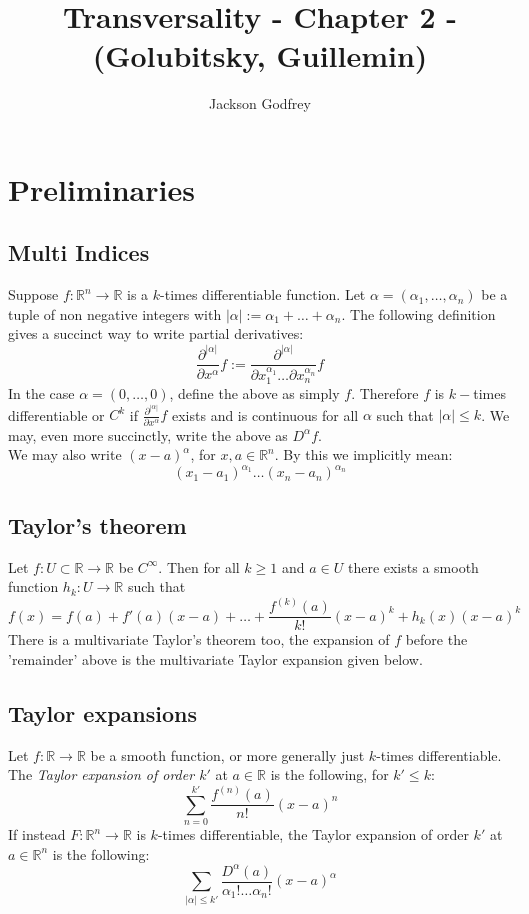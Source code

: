 \documentclass[12pt]{article}
\title{Transversality - Chapter 2 - (Golubitsky, Guillemin)}
\author{Jackson Godfrey}
\newcommand{\RR}{\mathbb{R}}
\begin{document}
\maketitle

\tableofcontents

\section*{Preliminaries}
\subsection*{Multi Indices}
Suppose $f: \RR^n \to \RR$ is a $k$-times differentiable function. Let $\alpha = (\alpha_1, \dots, \alpha_n)$ be a tuple of non negative integers with $|\alpha| := \alpha_1 + \dots + \alpha_n$. The following definition gives a succinct way to write partial derivatives:
$$
\frac{\partial^{|\alpha|}}{\partial x^\alpha} f := \frac{\partial^{|\alpha|}}{\partial x_1^{\alpha_1} \dots \partial x_n^{\alpha_n}} f
$$
In the case $\alpha = (0, \dots, 0)$, define the above as simply $f$. Therefore $f$ is $k-$times differentiable or $C^k$ if $\frac{\partial^{|\alpha|}}{\partial x^\alpha} f$ exists and is continuous for all $\alpha$ such that $|\alpha| \leq k$. We may, even more succinctly, write the above as $D^\alpha f$. \\

We may also write $(x-a)^\alpha$, for $x, a \in \RR^n$. By this we implicitly mean:
$$
(x_1-a_1)^{\alpha_1} \dots (x_n - a_n)^{\alpha_n}
$$

\subsection*{Taylor's theorem}

\begin{theorem} 
    Let $f: U\subset \RR \to \RR$ be $C^\infty$. Then for all $k \geq 1$ and $a\in U$ there exists a smooth function $h_k: U \to \RR$ such that 
    $$
    f(x) = f(a) + f'(a) (x-a) + \dots + \frac{f^{(k)}(a)}{k!} (x-a)^k + h_k(x) (x-a)^k 
    $$
    There is a multivariate Taylor's theorem too, the expansion of $f$ before the 'remainder' above is the multivariate Taylor expansion given below. 
\end{theorem}

\subsection*{Taylor expansions}
Let $f: \RR \to \RR$ be a smooth function, or more generally just $k$-times differentiable. The \emph{Taylor expansion of order $k'$} at $a\in \RR$ is the following, for $k' \leq k$: 
$$
\sum_{n=0}^{k'} \frac{f^{(n)}(a)}{n!} (x-a)^n
$$
If instead $F: \RR^n \to \RR$ is $k$-times differentiable, the Taylor expansion of order $k'$ at $a \in \RR^n$ is the following:
$$
\sum_{|\alpha| \leq k'} \frac{D^\alpha(a)}{\alpha_1! \dots \alpha_n !} (x - a)^\alpha
$$
\end{document}
